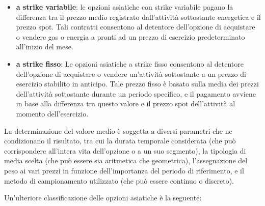 \documentclass[12pt,a4paper]{report}
\begin{document}
\begin{itemize}
    \item \textbf{a strike variabile}: le opzioni asiatiche con strike variabile pagano la differenza tra il prezzo medio registrato dall'attività sottostante energetica e il prezzo spot. Tali contratti consentono al detentore dell'opzione di acquistare o vendere gas o energia a pronti ad un prezzo di esercizio predeterminato all'inizio del mese.
    \item \textbf{a strike fisso}: Le opzioni asiatiche a strike fisso consentono al detentore dell'opzione di acquistare o vendere un'attività sottostante a un prezzo di esercizio stabilito in anticipo. Tale prezzo fisso è basato sulla media dei prezzi dell'attività sottostante durante un periodo specifico, e il pagamento avviene in base alla differenza tra questo valore e il prezzo spot dell'attività al momento dell'esercizio. 
\end{itemize}

La determinazione del valore medio è soggetta a diversi parametri che ne condizionano il risultato, tra cui la durata temporale considerata (che può corrispondere all'intera vita dell'opzione o a un suo segmento), la tipologia di media scelta (che può essere sia aritmetica che geometrica), l'assegnazione del peso ai vari prezzi in funzione dell'importanza del periodo di riferimento, e il metodo di campionamento utilizzato (che può essere continuo o discreto).

Un'ulteriore classificazione delle opzioni asiatiche è la seguente:
\end{document}
